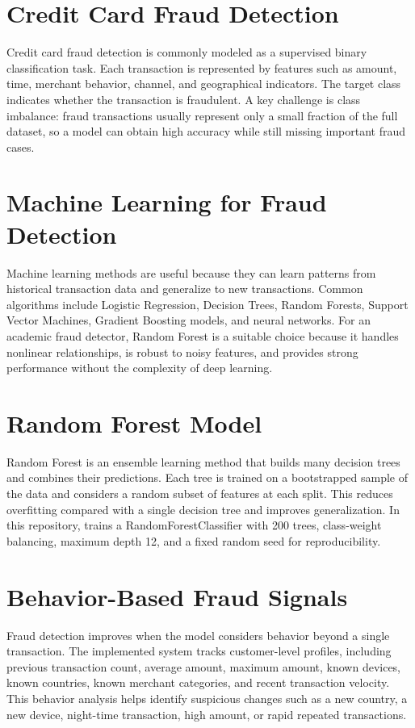 \documentclass[12pt,a4paper]{report}
\begin{document}
\section{Credit Card Fraud Detection}
Credit card fraud detection is commonly modeled as a supervised binary classification task. Each transaction is represented by features such as amount, time, merchant behavior, channel, and geographical indicators. The target class indicates whether the transaction is fraudulent. A key challenge is class imbalance: fraud transactions usually represent only a small fraction of the full dataset, so a model can obtain high accuracy while still missing important fraud cases.

\section{Machine Learning for Fraud Detection}
Machine learning methods are useful because they can learn patterns from historical transaction data and generalize to new transactions. Common algorithms include Logistic Regression, Decision Trees, Random Forests, Support Vector Machines, Gradient Boosting models, and neural networks. For an academic fraud detector, Random Forest is a suitable choice because it handles nonlinear relationships, is robust to noisy features, and provides strong performance without the complexity of deep learning.

\section{Random Forest Model}
Random Forest is an ensemble learning method that builds many decision trees and combines their predictions. Each tree is trained on a bootstrapped sample of the data and considers a random subset of features at each split. This reduces overfitting compared with a single decision tree and improves generalization. In this repository,  trains a RandomForestClassifier with 200 trees, class-weight balancing, maximum depth 12, and a fixed random seed for reproducibility.

\section{Behavior-Based Fraud Signals}
Fraud detection improves when the model considers behavior beyond a single transaction. The implemented system tracks customer-level profiles, including previous transaction count, average amount, maximum amount, known devices, known countries, known merchant categories, and recent transaction velocity. This behavior analysis helps identify suspicious changes such as a new country, a new device, night-time transaction, high amount, or rapid repeated transactions.
\end{document}
